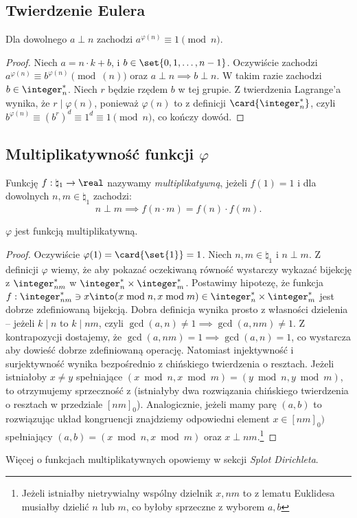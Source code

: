 \subsection{Twierdzenie Eulera}
\begin{theorem}
	\label{nt:phieuler}
	Dla dowolnego $a \perp n$ zachodzi $a^{\varphi(n)} \equiv 1 \pmod{n}$.
\end{theorem}
\begin{proof}
	Niech $a = n \cdot k + b$, i $b \in \set{0, 1, \ldots, n-1}$. Oczywiście
	zachodzi $a^{\varphi(n)} \equiv b^{\varphi(n)} \pmod(n)$ oraz $a \perp n \implies b \perp n$.
	W takim razie zachodzi $b \in \integer_n^*$. Niech $r$ będzie rzędem $b$ w tej grupie.
	Z twierdzenia Lagrange'a wynika, że $r \mid \varphi(n)$, ponieważ $\varphi(n)$ to z definicji
	$\card{\integer_n^*}$, czyli $b^{\varphi(n)} \equiv (b^r)^{d} \equiv 1^d \equiv 1 \pmod{n}$, co kończy dowód.
\end{proof}

\subsection{Multiplikatywność funkcji \texorpdfstring{$\varphi$}{phi}}
\begin{definition}
	Funkcję $f: \natural_1 \to \real$ nazywamy \textit{multiplikatywną}, jeżeli $f(1) = 1$ i dla dowolnych $n, m \in \natural_1$ zachodzi:
	$$n \perp m \implies f(n \cdot m) = f(n) \cdot f(m).$$
\end{definition}

\begin{theorem}
	\label{nt:phimulti}
	$\varphi$ jest funkcją multiplikatywną.
\end{theorem}
\begin{proof}
	Oczywiście $\varphi(1) = \card{\set{1}} = 1$. Niech $n, m \in \natural_1$ i $n \perp m$.
	Z definicji $\varphi$ wiemy, że aby pokazać oczekiwaną równość wystarczy wykazać bijekcję z $\integer_{nm}^*$ w $\integer_n^* \times \integer_m^*$.
	Postawimy hipotezę, że funkcja $f: \integer_{nm}^* \ni x \into (x \bmod n, x \bmod m) \in \integer_n^* \times \integer_m^*$ jest dobrze zdefiniowaną
	bijekcją.
	Dobra definicja wynika prosto z własności dzielenia -- jeżeli $k \mid n$ to $k \mid nm$, czyli $\gcd(a,n) \neq 1 \implies \gcd(a, nm) \neq 1$.
	Z kontrapozycji dostajemy, że $\gcd(a, nm) = 1 \implies \gcd(a, n) = 1$, co wystarcza aby dowieść dobrze zdefiniowaną operację.
	Natomiast injektywność i surjektywność wynika bezpośrednio z chińskiego twierdzenia o resztach.
	Jeżeli istniałoby $x \neq y$ spełniające $(x \bmod n, x \bmod m) = (y \bmod n, y \bmod m)$, to otrzymujemy sprzeczność z
	(istniałyby dwa rozwiązania chińskiego twierdzenia o resztach w przedziale $[nm]_0$). Analogicznie, jeżeli mamy parę $(a, b)$ to rozwiązując układ kongruencji znajdziemy
	odpowiedni element $x \in [nm]_0)$ spełniający $(a, b) = (x \bmod n, x \bmod m)$ oraz $x \perp nm$.\footnote{Jeżeli istniałby nietrywialny wspólny dzielnik $x, nm$ to z lematu Euklidesa musiałby dzielić $n$ lub $m$, co byłoby sprzeczne z wyborem $a, b$}
\end{proof}
Więcej o funkcjach multiplikatywnych opowiemy w sekcji \textit{Splot Dirichleta}.

